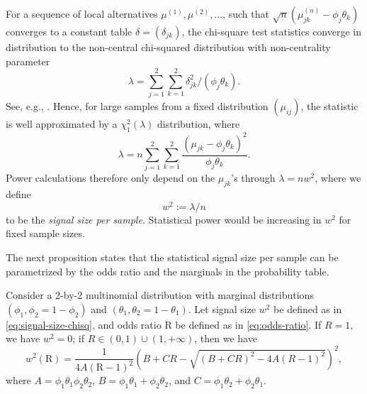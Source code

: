 For a sequence of local alternatives $\mu^{(1)}, \mu^{(2)}, \ldots$, such that $\sqrt{n}(\mu^{(n)}_{jk} - \phi_j\theta_k)$ converges to a constant table $\delta = (\delta_{jk})$, the chi-square test statistics converge in distribution to the non-central chi-squared distribution with non-centrality parameter 
\begin{equation*}
    \lambda = \sum_{j=1}^2 \sum_{k=1}^2 {\delta_{jk}^2}/{(\phi_j\theta_k)}.
\end{equation*}
See, e.g., \cite{ferguson2017course}.
Hence, for large samples from a fixed distribution $(\mu_{ij})$, the statistic is well approximated by a $\chi^2_1(\lambda)$ distribution, where
\begin{equation} 
\lambda = n\sum_{j=1}^2 \sum_{k=1}^2 \frac{(\mu_{jk} - \phi_j\theta_k)^2}{\phi_j\theta_k}.
\end{equation}
Power calculations therefore only depend on the $\mu_{jk}$'s through $\lambda=nw^2$, where we define 
\begin{equation} \label{eq:signal-size-chisq}
    w^2:=\lambda/n
\end{equation} 
to be the \emph{signal size per sample}. 
Statistical power would be increasing in $w^2$ for fixed sample sizes.

The next proposition states that the statistical signal size per sample can be parametrized by the odds ratio and the marginals in the probability table.

\begin{proposition} \label{prop:signal-size-odds-ratio}
Consider a 2-by-2 multinomial distribution with marginal distributions $(\phi_1, \phi_2 = 1-\phi_2)$ and $(\theta_1, \theta_2=1-\theta_1)$.
Let signal size $w^2$ be defined as in \eqref{eq:signal-size-chisq}, and odds ratio $\text{R}$ be defined as in \eqref{eq:odds-ratio}. 
If $R=1$, we have $w^2 = 0$; if $R\in(0,1)\cup(1,+\infty)$, then we have
\begin{equation} \label{eq:signal-size-odds-ratio}
    w^2(\text{R}) =
    \frac{1}{4A(\text{R}-1)^2}\left(B+CR-\sqrt{(B+CR)^2-4A(R-1)^2}\right)^2,
\end{equation}
where $A = \phi_1\theta_1\phi_2\theta_2$, $B = \phi_1\theta_1+\phi_2\theta_2$, and $C = \phi_1\theta_2+\phi_2\theta_1$.
\end{proposition}

